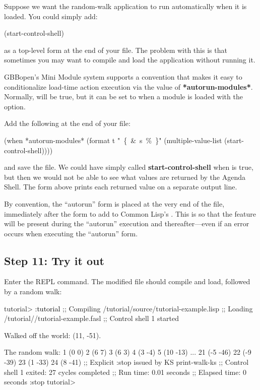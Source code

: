 \documentclass[10pt,twoside,english,pdftex]{article}
\begin{document}
Suppose we want the random-walk application to run automatically when it is
loaded.  You could simply add:
% 
\W\supp
\begin{example}
\textcolor{darkergray}{%
  (start-control-shell)}
\end{example}
%
as a top-level form at the end of your  file.  The
problem with this is that sometimes you may want to compile and load the
application without running it.  

GBBopen's Mini Module system supports a convention that makes it easy to
conditionalize load-time action execution via the value of
\textbf{*autorun-modules*}.  Normally,  will be
true, but it can be set to \nil{} when a module is loaded with the
 option.

Add the following at the end of your 
file:
% 
\W\supp
\begin{example}
  (when *autorun-modules* 
    (format t "~\{~\&~s~\%~\}" (multiple-value-list (start-control-shell))))
\end{example}
%
and save the file.  We could have simply called \textbf{start-control-shell}
when  is true, but then we would not be able to see
what values are returned by the Agenda Shell.  The  form above
prints each returned value on a separate output line.

By convention, the ``autorun'' form is placed at the very end of the file,
immediately after the form to add  to Common Lisp's
.  This is so that the  feature will be
present during the ``autorun'' execution and thereafter---even if an error
occurs when executing the ``autorun'' form.

\subsection*{Step 11: Try it out}

Enter the  REPL command. The modified
 file should compile and load, followed by a
random walk:
%
\W\supp
\begin{example}
\textcolor{darkergray}{%
  tutorial> \textcolor{black}{:tutorial}
  ;; Compiling /tutorial/source/tutorial-example.lisp
  ;; Loading /tutorial//tutorial-example.fasl
  ;; Control shell 1 started

  Walked off the world: (11, -51).

  The random walk:
  1 (0 0)
  2 (6 7)
  3 (6 3)
  4 (3 -4)
  5 (10 -13)
     ...
  21 (-5 -46)
  22 (-9 -39)
  23 (1 -33)
  24 (8 -41)
  ;; Explicit :stop issued by KS print-walk-ks
  ;; Control shell 1 exited: 27 cycles completed
  ;; Run time: 0.01 seconds
  ;; Elapsed time: 0 seconds
  :stop
  tutorial>}
\end{example}
\end{document}
